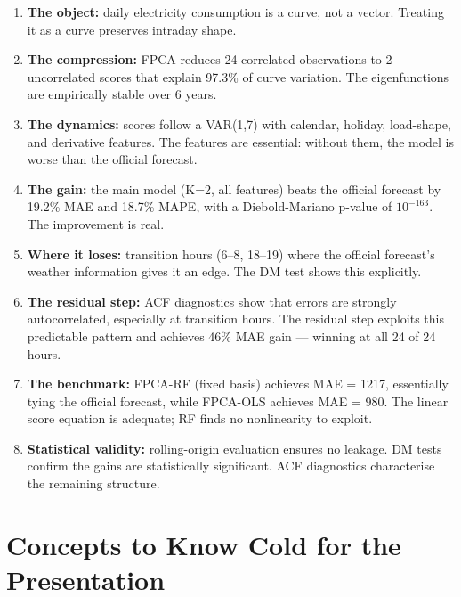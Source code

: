 \documentclass[11pt,a4paper]{article}
\begin{document}
\begin{enumerate}
  \item \textbf{The object:} daily electricity consumption is a curve, not
    a vector. Treating it as a curve preserves intraday shape.

  \item \textbf{The compression:} FPCA reduces 24 correlated observations
    to 2 uncorrelated scores that explain 97.3\% of curve variation.
    The eigenfunctions are empirically stable over 6 years.

  \item \textbf{The dynamics:} scores follow a VAR(1,7) with calendar,
    holiday, load-shape, and derivative features. The features are
    essential: without them, the model is worse than the official forecast.

  \item \textbf{The gain:} the main model (K=2, all features) beats the
    official forecast by 19.2\% MAE and 18.7\% MAPE, with a
    Diebold-Mariano p-value of $10^{-163}$. The improvement is real.

  \item \textbf{Where it loses:} transition hours (6--8, 18--19) where
    the official forecast's weather information gives it an edge. The
    DM test shows this explicitly.

  \item \textbf{The residual step:} ACF diagnostics show that errors are
    strongly autocorrelated, especially at transition hours. The
    residual step exploits this predictable pattern and achieves 46\%
    MAE gain --- winning at all 24 of 24 hours.

  \item \textbf{The benchmark:} FPCA-RF (fixed basis) achieves MAE = 1217,
    essentially tying the official forecast, while FPCA-OLS achieves MAE = 980.
    The linear score equation is adequate; RF finds no nonlinearity to exploit.

  \item \textbf{Statistical validity:} rolling-origin evaluation ensures
    no leakage. DM tests confirm the gains are statistically significant.
    ACF diagnostics characterise the remaining structure.
\end{enumerate}

\section{Concepts to Know Cold for the Presentation}
\end{document}
